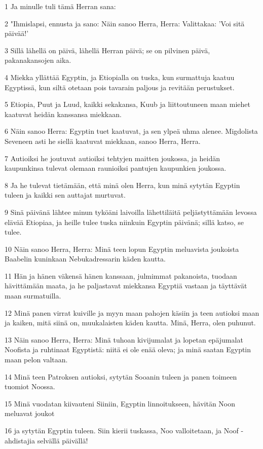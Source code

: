 \par 1 Ja minulle tuli tämä Herran sana:
\par 2 "Ihmislapsi, ennusta ja sano: Näin sanoo Herra, Herra: Valittakaa: 'Voi sitä päivää!'
\par 3 Sillä lähellä on päivä, lähellä Herran päivä; se on pilvinen päivä, pakanakansojen aika.
\par 4 Miekka yllättää Egyptin, ja Etiopialla on tuska, kun surmattuja kaatuu Egyptissä, kun siltä otetaan pois tavarain paljous ja revitään perustukset.
\par 5 Etiopia, Puut ja Luud, kaikki sekakansa, Kuub ja liittoutuneen maan miehet kaatuvat heidän kanssansa miekkaan.
\par 6 Näin sanoo Herra: Egyptin tuet kaatuvat, ja sen ylpeä uhma alenee. Migdolista Seveneen asti he siellä kaatuvat miekkaan, sanoo Herra, Herra.
\par 7 Autioiksi he joutuvat autioiksi tehtyjen maitten joukossa, ja heidän kaupunkinsa tulevat olemaan raunioiksi pantujen kaupunkien joukossa.
\par 8 Ja he tulevat tietämään, että minä olen Herra, kun minä sytytän Egyptin tuleen ja kaikki sen auttajat murtuvat.
\par 9 Sinä päivänä lähtee minun tyköäni laivoilla lähettiläitä peljästyttämään levossa elävää Etiopiaa, ja heille tulee tuska niinkuin Egyptin päivänä; sillä katso, se tulee.
\par 10 Näin sanoo Herra, Herra: Minä teen lopun Egyptin meluavista joukoista Baabelin kuninkaan Nebukadressarin käden kautta.
\par 11 Hän ja hänen väkensä hänen kanssaan, julmimmat pakanoista, tuodaan hävittämään maata, ja he paljastavat miekkansa Egyptiä vastaan ja täyttävät maan surmatuilla.
\par 12 Minä panen virrat kuiville ja myyn maan pahojen käsiin ja teen autioksi maan ja kaiken, mitä siinä on, muukalaisten käden kautta. Minä, Herra, olen puhunut.
\par 13 Näin sanoo Herra, Herra: Minä tuhoan kivijumalat ja lopetan epäjumalat Noofista ja ruhtinaat Egyptistä: niitä ei ole enää oleva; ja minä saatan Egyptin maan pelon valtaan.
\par 14 Minä teen Patroksen autioksi, sytytän Sooanin tuleen ja panen toimeen tuomiot Noossa.
\par 15 Minä vuodatan kiivauteni Siiniin, Egyptin linnoitukseen, hävitän Noon meluavat joukot
\par 16 ja sytytän Egyptin tuleen. Siin kierii tuskassa, Noo valloitetaan, ja Noof - ahdistajia selvällä päivällä!
